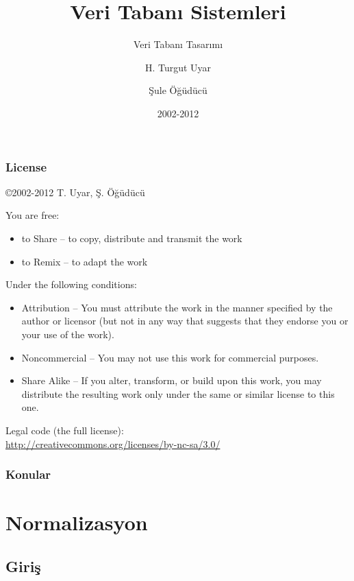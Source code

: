 \documentclass[dvipsnames]{beamer}
\title{Veri Tabanı Sistemleri}
\subtitle{Veri Tabanı Tasarımı}
\author{H. Turgut Uyar \and Şule Öğüdücü}
\date{2002-2012}
\theoremstyle{definition}
\theoremstyle{example}
\theoremstyle{plain}
\begin{document}
\begin{frame}
  \titlepage
\end{frame}

\begin{frame}
  \frametitle{License}

  \hfill
  \copyright 2002-2012 T. Uyar, Ş. Öğüdücü

  \vfill
  \begin{tiny}
    You are free:
    \begin{itemize}
      \item to Share -- to copy, distribute and transmit the work
      \item to Remix -- to adapt the work
    \end{itemize}

    Under the following conditions:
    \begin{itemize}
      \item Attribution -- You must attribute the work in the manner specified by
        the author or licensor (but not in any way that suggests that they
        endorse you or your use of the work).

      \item Noncommercial -- You may not use this work for commercial purposes.

      \item Share Alike -- If you alter, transform, or build upon this work, you
        may distribute the resulting work only under the same or similar license
        to this one.
    \end{itemize}
  \end{tiny}

  \vfill
  Legal code (the full license):\\
  \url{http://creativecommons.org/licenses/by-nc-sa/3.0/}
\end{frame}

\begin{frame}
  \frametitle{Konular}
  \tableofcontents
\end{frame}

\section{Normalizasyon}

\subsection{Giriş}
\end{document}
